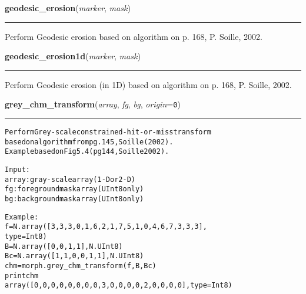     \begin{boxedminipage}{\textwidth}

    \raggedright \textbf{geodesic\_erosion}(\textit{marker}, \textit{mask})

    \vspace{-1.5ex}

    \rule{\textwidth}{0.5\fboxrule}
    Perform Geodesic erosion based on algorithm on p. 168, P. Soille, 
    2002.

    \vspace{1ex}

    \end{boxedminipage}

    \label{multireg:morph:geodesic_erosion1d}
    \vspace{0.5ex}

    \begin{boxedminipage}{\textwidth}

    \raggedright \textbf{geodesic\_erosion1d}(\textit{marker}, \textit{mask})

    \vspace{-1.5ex}

    \rule{\textwidth}{0.5\fboxrule}
    Perform Geodesic erosion (in 1D) based on algorithm on p. 168, P. 
    Soille, 2002.

    \vspace{1ex}

    \end{boxedminipage}

    \label{multireg:morph:grey_chm_transform}
    \vspace{0.5ex}

    \begin{boxedminipage}{\textwidth}

    \raggedright \textbf{grey\_chm\_transform}(\textit{array}, \textit{fg}, \textit{bg}, \textit{origin}=\texttt{0\-})

    \vspace{-1.5ex}

    \rule{\textwidth}{0.5\fboxrule}
\begin{alltt}
Perform Grey-scale constrained-hit-or-miss transform
   based on algorithm from pg. 145, Soille (2002).
   Example based on Fig 5.4 (pg 144, Soille 2002).

Input:
   array: gray-scale array (1-D or 2-D)
   fg   : foreground mask array (UInt8 only)
   bg   : background mask array (UInt8 only)

 Example:
   f = N.array([3, 3, 3, 0, 1, 6, 2, 1, 7, 5, 1, 0, 4, 6, 7, 3, 3, 3], 
               type=Int8)
   B = N.array([0,0,1,1],N.UInt8)
   Bc = N.array([1,1,0,0,1,1],N.UInt8)
   chm = morph.grey\_chm\_transform(f,B,Bc)
   print chm
   array([0, 0, 0, 0, 0, 0, 0, 0, 3, 0, 0, 0, 0, 2, 0, 0, 0, 0], type=Int8)\end{alltt}

    \vspace{1ex}

    \end{boxedminipage}

